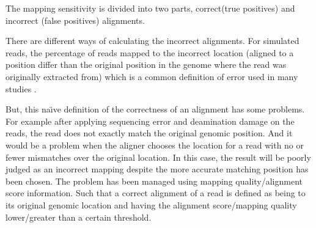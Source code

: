 \documentclass[11pt,a4paper]{report}
\begin{document}
The mapping sensitivity is divided into two parts, correct(true positives) and 
incorrect (false positives) alignments.

There are different ways of calculating the incorrect alignments. For simulated 
reads, the percentage of reads mapped to the incorrect location (aligned to 
a position differ than the original position in the genome where the read was 
originally extracted from) which is a common definition of error used in many 
studies \cite{ErrorDef}. 

But, this na\"{\i}ve definition of the correctness of an alignment has some 
problems. For example after applying sequencing error and deamination damage on 
the reads, the read does not exactly match the original genomic position. And 
it would be a problem when the aligner chooses the location for a read with no or 
fewer mismatches over the original location. In this case, the result will be 
poorly judged as an incorrect mapping despite the more accurate matching position 
has been chosen. The problem has been managed using mapping quality/alignment 
score information. Such that a correct alignment of a read is defined as being 
to its original genomic location and having the alignment score/mapping quality 
lower/greater than a certain threshold. 









\end{document}
